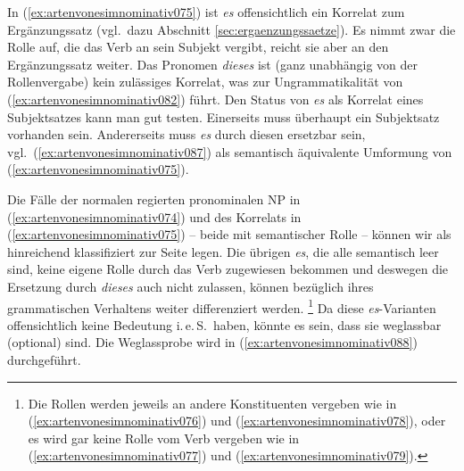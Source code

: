 In (\ref{ex:artenvonesimnominativ075}) ist \textit{es} offensichtlich ein Korrelat zum Ergänzungssatz (vgl.\ dazu Abschnitt \ref{sec:ergaenzungssaetze}).
Es nimmt zwar die Rolle auf, die das Verb an sein Subjekt vergibt, reicht sie aber an den Ergänzungssatz weiter.
Das Pronomen \textit{dieses} ist (ganz unabhängig von der Rollenvergabe) kein zulässiges Korrelat, was zur Ungrammatikalität von (\ref{ex:artenvonesimnominativ082}) führt.
Den Status von \textit{es} als Korrelat eines Subjektsatzes kann man gut testen.
Einerseits muss überhaupt ein Subjektsatz vorhanden sein.
Andererseits muss \textit{es} durch diesen ersetzbar sein, vgl.\ (\ref{ex:artenvonesimnominativ087}) als semantisch äquivalente Umformung von (\ref{ex:artenvonesimnominativ075}).


\begin{exe}
\end{exe}


Die Fälle der normalen regierten pronominalen NP in (\ref{ex:artenvonesimnominativ074}) und des Korrelats in (\ref{ex:artenvonesimnominativ075}) -- beide mit semantischer Rolle -- können wir als hinreichend klassifiziert zur Seite legen.
Die übrigen \textit{es}, die alle semantisch leer sind, keine eigene Rolle durch das Verb zugewiesen bekommen und deswegen die Ersetzung durch \textit{dieses} auch nicht zulassen, können bezüglich ihres grammatischen Verhaltens weiter differenziert werden.%
\footnote{Die Rollen werden jeweils an andere Konstituenten vergeben wie in (\ref{ex:artenvonesimnominativ076}) und (\ref{ex:artenvonesimnominativ078}), oder es wird gar keine Rolle vom Verb vergeben wie in (\ref{ex:artenvonesimnominativ077}) und (\ref{ex:artenvonesimnominativ079}).}
Da diese \textit{es}-Varianten offensichtlich keine Bedeutung i.\,e.\,S.\ haben, könnte es \zB sein, dass sie weglassbar (optional) sind.
Die Weglassprobe wird in (\ref{ex:artenvonesimnominativ088}) durchgeführt.


\begin{exe}
  \ex\label{ex:artenvonesimnominativ088}
  \begin{xlist}
  \end{xlist}
\end{exe}


